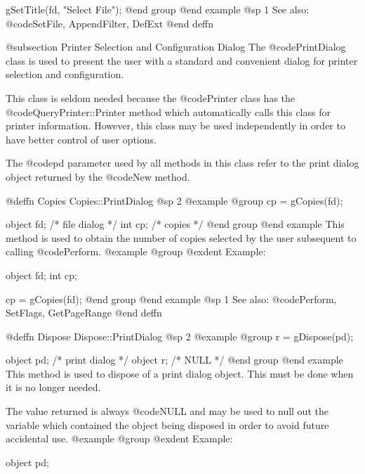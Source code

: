 gSetTitle(fd, "Select File");
@end group
@end example
@sp 1
See also:  @code{SetFile, AppendFilter, DefExt}
@end deffn





@subsection Printer Selection and Configuration Dialog
The @code{PrintDialog} class is used to present the user with a standard
and convenient dialog for printer selection and configuration.

This class is seldom needed because the @code{Printer} class has
the @code{QueryPrinter::Printer} method which automatically calls
this class for printer information.  However, this class may be used
independently in order to have better control of user options.


The @code{pd} parameter used by all methods in this class refer to
the print dialog object returned by the @code{New} method.














@deffn {Copies} Copies::PrintDialog
@sp 2
@example
@group
cp = gCopies(fd);

object  fd;     /*  file dialog  */
int     cp;     /*  copies       */
@end group
@end example
This method is used to obtain the number of copies selected by the user
subsequent to calling @code{Perform}.
@example
@group
@exdent Example:

object  fd;
int     cp;

cp = gCopies(fd);
@end group
@end example
@sp 1
See also:  @code{Perform, SetFlags, GetPageRange}
@end deffn









@deffn {Dispose} Dispose::PrintDialog
@sp 2
@example
@group
r = gDispose(pd);

object  pd;     /*  print dialog   */
object  r;      /*  NULL           */
@end group
@end example
This method is used to dispose of a print dialog object.  This must
be done when it is no longer needed.

The value returned is always @code{NULL} and may be used to null out
the variable which contained the object being disposed in order to
avoid future accidental use.
@example
@group
@exdent Example:

object  pd;

